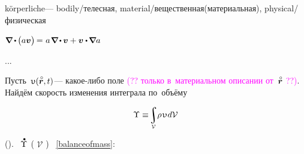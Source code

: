 \begin{otherlanguage}{russian}

körperliche\:--- bodily/телесная, material/вещественная(материальная), physical/физическая

${
\boldnabla \hspace{-0.1ex} \dotp \hspace{-0.15ex} \bigl( a \bm{v} \bigr) \hspace{-0.2ex} = \hspace{.1ex} a \hspace{.2ex} \boldnabla \hspace{-0.2ex} \dotp \hspace{-0.1ex} \bm{v} + \bm{v} \dotp \hspace{-0.2ex} \boldnabla a
}$

...

Пусть~${\upupsilon(\initiallocationvector, t)}$\:--- какое\hbox{-}либо поле \textcolor{magenta}{(?? только в~материальном описании от~${\initiallocationvector}$ ??)}.
Найдём скорость изменения интеграла по~объёму

\nopagebreak\vspace{-0.25em}\begin{equation*}
\Upsilon
\equiv \hspace{-0.4ex} \scalebox{0.9}{$\displaystyle\integral\displaylimits_{\mathcal{V}}$} \hspace{-0.1ex} \rho \hspace{.19ex} \upupsilon \hspace{.11ex} d\mathcal{V}
\end{equation*}

\vspace{-0.4em}\noindent
().
 ~${\mathdotabove{\Upsilon}}$ ( $\mathcal{V}$ )   ~\eqref{balanceofmass}:


\end{otherlanguage}
